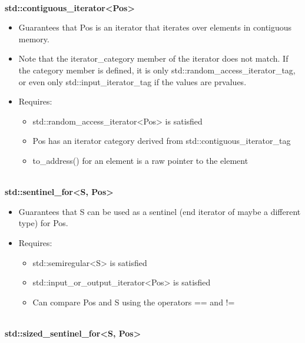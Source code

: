 \noindent
\hspace*{\fill} \\ %
\textbf{std::contiguous\_iterator<Pos>}

\begin{itemize}
\item
Guarantees that Pos is an iterator that iterates over elements in contiguous memory.

\item
Note that the iterator\_category member of the iterator does not match. If the category member is defined, it is only std::random\_access\_iterator\_tag, or even only std::input\_iterator\_tag if the values are prvalues.

\item
Requires:
\begin{itemize}
\item
std::random\_access\_iterator<Pos> is satisfied

\item
Pos has an iterator category derived from std::contiguous\_iterator\_tag

\item
to\_address() for an element is a raw pointer to the element
\end{itemize}
\end{itemize}

\noindent
\hspace*{\fill} \\ %
\textbf{std::sentinel\_for<S, Pos>}

\begin{itemize}
\item
Guarantees that S can be used as a sentinel (end iterator of maybe a different type) for Pos.

\item
Requires:
\begin{itemize}
\item
std::semiregular<S> is satisfied

\item
std::input\_or\_output\_iterator<Pos> is satisfied

\item
Can compare Pos and S using the operators == and !=
\end{itemize}
\end{itemize}

\noindent
\hspace*{\fill} \\ %
\textbf{std::sized\_sentinel\_for<S, Pos>}


